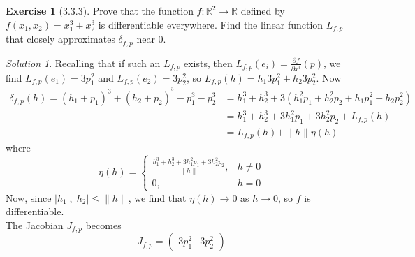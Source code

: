 \documentclass[reqno]{amsart}
\theoremstyle{plain}%
\theoremstyle{definition}
\newtheorem{exercise}[theorem]{Exercise}
\theoremstyle{remark}
\newtheorem*{solution}{Solution}
\begin{document}
    \begin{exercise}[3.3.3]
        Prove that the function $f  \colon \mathbb{R}^2 \to \mathbb{R}$ 
        defined by $f\left( x_1, x_2 \right) =
        x_1^3 + x_2^3$ is differentiable everywhere. Find the linear
        function $L_{f,p}$ that closely approximates $\delta_{f,p}$ 
        near $0$.
    \end{exercise}

    \begin{solution}
        Recalling that if such an $L_{f,p}$ exists, then
        $L_{f,p}(e_i) = \frac{\partial f}{\partial x^{i}}(p) $, we
        find $L_{f,p}(e_1) = 3 p_1^2$ and
        $L_{f,p}(e_2) = 3p_2^2$, so
        $L_{f,p}(h) = h_1 3p_1^2 + h_2 3 p_2^2$. Now
        \begin{align*}
        \delta_{f,p}(h) = \left( h_1+p_1 \right)^3 + \left( h_2
        +p_2\right)^^3 - p_1^3 - p_2^3 
        &= 
        h_1^3 + h_2^3 + 3 \left( h_1^2 p_1 + h_2^2 p_2 +
        h_1p_1^2 + h_2p_2^2 \right)\\ 
        &=
        h_1^3 + h_2^3 + 3h_1^2 p_1 + 3h_2^2 p_2 + 
        L_{f,p}(h)\\
        &= L_{f,p}(h) + \|h \| \eta (h)
        \end{align*}
        where         
        \[
        \eta (h) =
        \begin{cases}
            \frac{h_1^3 + h_2^3 + 3h_1^2 p_1 + 3h_2^2 p_2}{
            \|h\|},& h\neq 0\\
            0,& h=0
        \end{cases}
    \]
        Now, since $\left| h_1 \right| ,
        \left| h_2 \right| \le \|h\|$, we find that
        $\eta (h) \to 0$ as $h\to 0$, so
        $f$ is differentiable.\\
        The Jacobian $J_{f,p}$ becomes
        \[
        J_{f,p} = \begin{pmatrix} 
            3p_1^2 & 3p_2^2
        \end{pmatrix} 
        \] 
        

        
    \end{solution}





%
\end{document}
